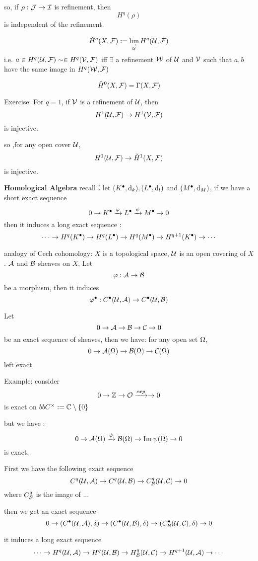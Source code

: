 so, if $\rho:\mathcal{J}\to \mathcal{I}$ is refinement, then
$$H^q(\rho)$$
is independent of the refinement.

\begin{definition}
$$\check{H}^q(X,\mathcal{F}):=\lim_{\to\atop\mathcal{U}} H^q(\mathcal{U},\mathcal{F})$$
i.e. $a\in H^q(\mathcal{U},\mathcal{F})\sim\in H^q(\mathcal{V},\mathcal{F})$ iff
$\exists$ a refinement $\mathcal{W}$ of $\mathcal{U}$ and $\mathcal{V}$ such that
$a,b$ have the same image in $H^q(\mathcal{W},\mathcal{F})$
\end{definition}

\begin{rem}
$$\check{H}^0(X,\mathcal{F})=\Gamma(X,\mathcal{F})$$

Exercise: For $q=1$, if $\mathcal{V}$ is a refinement of $\mathcal{U}$,
then
$$H^1(\mathcal{U},\mathcal{F})\to H^1(\mathcal{V},\mathcal{F})$$
is injective.
\end{rem}

so ,for any open cover $\mathcal{U}$,
$$H^1(\mathcal{U},\mathcal{F})\to \check{H}^1(X,\mathcal{F})$$
is injective.

\textbf{Homological Algebra}
recall：let $(K^{\bullet},\mathrm{d}_k),(L^{\bullet},\mathrm{d}_l)$ and $(M^{\bullet},\mathrm{d}_M)$,
if we have a short exact sequence
$$0\to K^{\bullet}\xrightarrow{\varphi} L^{\bullet}\xrightarrow{\psi}M^{\bullet}\to 0$$
then it induces a long exact sequence :
$$
  \cdots\to H^q(K^{\bullet})\to
  H^q(L^{\bullet})\to
  H^q(M^{\bullet})\to
  H^{q+1}(K^{\bullet})\to\cdots
$$

analogy of Cech cohomology: $X$ is a topological space,
$\mathcal{U}$ is an open covering of $X$.
$\mathcal{A}$ and $\mathcal{B}$ sheaves on $X$, Let
$$\varphi:\mathcal{A}\to\mathcal{B}$$
be a morphism, then it induces
$$\varphi^{\bullet}:C^{\bullet}(\mathcal{U},\mathcal{A})\to C^{\bullet}(\mathcal{U},\mathcal{B})$$

Let
$$0\to \mathcal{A}\to\mathcal{B}\to\mathcal{C}\to 0$$
be an exact sequence of sheaves, then we have:
for any open set $\Omega$,
$$0\to \mathcal{A}(\Omega)\to \mathcal{B}(\Omega)\to\mathcal{C}(\Omega)$$
left exact.

Example: consider
$$0\to\mathbb{Z}\to\mathcal{O}\xrightarrow{exp}\to0$$
is exact on $bbC^{\times}:=\mathbb{C}\setminus\{0\}$

but we have :
$$0\to\mathcal{A}(\Omega)\xrightarrow{\psi}\mathcal{B}(\Omega)\to\operatorname{Im}\psi(\Omega)\to 0$$
is exact.

First we have the following exact sequence
$$C^q(\mathcal{U},\mathcal{A})\to C^q(\mathcal{U},\mathcal{B})\to C^q_{\mathcal{B}}(\mathcal{U},\mathcal{C})\to 0$$
where $C_{\mathcal{B}}^q$ is the image of ...

then we get an exact sequence
$$0\to (C^{\bullet}(\mathcal{U},\mathcal{A}),\delta)\to
(C^{\bullet}(\mathcal{U},\mathcal{B}),\delta)\to
(C^{\bullet}_{\mathcal{B}}(\mathcal{U},\mathcal{C}),\delta)\to 0$$

it induces a long exact sequence
$$\cdots\to
H^q(\mathcal{U},\mathcal{A})\to
H^q(\mathcal{U},\mathcal{B})\to
H^q_{\mathcal{B}}(\mathcal{U},\mathcal{C})\to
H^{q+1}(\mathcal{U},\mathcal{A})\to\cdots
$$

